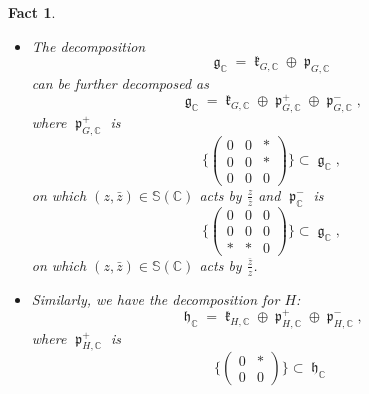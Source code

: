 \documentclass[11pt, a4paper]{amsart}
\theoremstyle{plain}
\newtheorem{fact}[theorem]{Fact}
\theoremstyle{definition}
\numberwithin{equation}{section}
\def\CC{\mathbb{C}}
\DeclareMathOperator{\lieg}{\mathfrak g}
\DeclareMathOperator{\liek}{\mathfrak k}
\DeclareMathOperator{\lieh}{\mathfrak h}
\DeclareMathOperator{\liep}{\mathfrak p}
\begin{document}
\begin{fact}
    \begin{itemize}
        \item The decomposition
              \begin{equation*}
                  \lieg_{\CC} = \liek_{G, \CC} \oplus \liep_{G, \CC}
              \end{equation*}
              can be further decomposed as 
              \begin{equation*}
                  \lieg_{\CC} = \liek_{G, \CC} \oplus \liep^{+}_{G, \CC} \oplus \liep^{-}_{G, \CC}, 
              \end{equation*}
              where $\liep^{+}_{G, \CC}$ is 
              \begin{equation*}
                  \{\begin{pmatrix}
                    0 & 0 & * \\
                    0 & 0 & * \\
                    0 & 0 & 0 
                  \end{pmatrix}\} \subset \lieg_{\CC}, 
              \end{equation*}
              on which $(z, \bar{z}) \in \mathbb{S}(\CC)$ acts by $\frac{z}{\bar{z}}$ and
              $\liep^{-}_{\CC}$ is 
              \begin{equation*}
                  \{\begin{pmatrix}
                    0 & 0 & 0 \\
                    0 & 0 & 0 \\
                    * & * & 0 
                  \end{pmatrix}\} \subset \lieg_{\CC}, 
              \end{equation*}
              on which $(z, \bar{z}) \in \mathbb{S}(\CC)$ acts by $\frac{\bar{z}}{z}$. 
        \item Similarly, we have the decomposition for $H$: 
              \begin{equation*}
                  \lieh_{\CC} = \liek_{H, \CC} \oplus \liep^{+}_{H, \CC} \oplus \liep^{-}_{H, \CC}, 
              \end{equation*}
              where $\liep^{+}_{H, \CC}$ is 
              \begin{equation*}
                   \{\begin{pmatrix}
                        0 & * \\
                        0 & 0 
                     \end{pmatrix}\} \subset \lieh_{\CC}

\end{equation*}
\end{itemize}
\end{fact}
\end{document}
